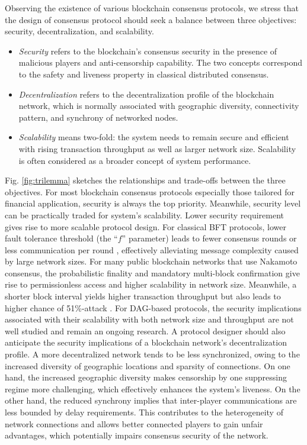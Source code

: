Observing the existence of various blockchain consensus protocols, we stress that the design of consensus protocol should seek a balance between three objectives: security, decentralization, and scalability. 
\begin{itemize}
    \item \textit{Security} refers to the blockchain's consensus security in the presence of malicious players and anti-censorship capability. The two concepts correspond to the safety and liveness property in classical distributed consensus. 
    \item \textit{Decentralization} refers to the decentralization profile of the blockchain network, which is normally associated with geographic diversity, connectivity pattern, and synchrony of networked nodes.
    \item \textit{Scalability} means two-fold: the system needs to remain secure and efficient with rising transaction throughput as well as larger network size. Scalability is often considered as a broader concept of system performance.
\end{itemize}
Fig. \ref{fig:trilemma} sketches the relationships and trade-offs between the three objectives.
For most blockchain consensus protocols especially those tailored for financial application, security is always the top priority. Meanwhile, security level can be practically traded for system's scalability. Lower security requirement gives rise to more scalable protocol design. For classical BFT protocols, lower fault tolerance threshold (the ``$f$'' parameter) leads to fewer consensus rounds  or less communication per round , effectively alleviating message complexity caused by large network sizes. For many public blockchain networks that use Nakamoto consensus, the probabilistic finality and mandatory multi-block confirmation give rise to permissionless access and higher scalability in network size. Meanwhile, a shorter block interval yields higher transaction throughput but also leads to higher chance of 51\%-attack . For DAG-based protocols, the security implications associated with their scalability with both network size and throughput are not well studied and remain an ongoing research.
A protocol designer should also anticipate the security implications of a blockchain network's decentralization profile. A more decentralized network tends to be less synchronized, owing to the increased diversity of geographic locations and sparsity of connections. On one hand, the increased geographic diversity makes censorship by one suppressing regime more challenging, which effectively enhances the system's liveness. On the other hand, the reduced synchrony implies that inter-player communications are less bounded by delay requirements. This contributes to the heterogeneity of network connections and allows better connected players to gain unfair advantages, which potentially impairs consensus security of the network. 
